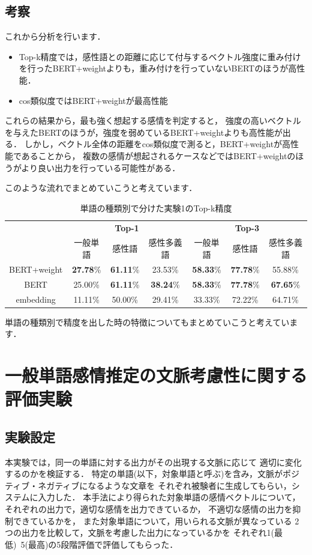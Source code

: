	\subsection{考察}
		これから分析を行います．
		\begin{itemize}
			\item Top-k精度では，感性語との距離に応じて付与するベクトル強度に重み付けを行ったBERT+weightよりも，重み付けを行っていないBERTのほうが高性能．
			\item cos類似度ではBERT+weightが最高性能
		\end{itemize}
		これらの結果から，最も強く想起する感情を判定すると，
		強度の高いベクトルを与えたBERTのほうが，強度を弱めているBERT+weightよりも高性能が出る．
		しかし，ベクトル全体の距離をcos類似度で測ると，BERT+weightが高性能であることから，
		複数の感情が想起されるケースなどではBERT+weightのほうがより良い出力を行っている可能性がある．
		
		このような流れでまとめていこうと考えています．
		\begin{table}[H]
			\centering
			\caption{単語の種類別で分けた実験1のTop-k精度}
			\label{table:top-k_cos-sim_hinshi}
				\begin{tabular}{ccccccc}
					\hline
					& \multicolumn{3}{c}{\textbf{Top-1}} & \multicolumn{3}{c}{\textbf{Top-3}} \\
					& 一般単語 & 感性語 & 感性多義語 & 一般単語 & 感性語 & 感性多義語 \\
					\hline \hline
					BERT+weight & \textbf{27.78}\% & \textbf{61.11}\% & 23.53\% & \textbf{58.33}\% & \textbf{77.78}\% & 55.88\% \\
					BERT & 25.00\% & \textbf{61.11}\% & \textbf{38.24}\% & \textbf{58.33}\% & \textbf{77.78}\% & \textbf{67.65}\% \\
					embedding & 11.11\% & 50.00\% & 29.41\% & 33.33\% & 72.22\% & 64.71\% \\
				\hline
				\end{tabular}
		\end{table}

		単語の種類別で精度を出した時の特徴についてもまとめていこうと考えています．

					

\section{一般単語感情推定の文脈考慮性に関する評価実験}
	\subsection{実験設定}
		本実験では，同一の単語に対する出力がその出現する文脈に応じて
		適切に変化するのかを検証する．
		特定の単語(以下，対象単語と呼ぶ)を含み，文脈がポジティブ・ネガティブになるような文章を
		それぞれ被験者に生成してもらい，システムに入力した．
		本手法により得られた対象単語の感情ベクトルについて，
		それぞれの出力で，適切な感情を出力できているか，
		不適切な感情の出力を抑制できているかを，
		また対象単語について，用いられる文脈が異なっている
		2つの出力を比較して，文脈を考慮した出力になっているかを
		それぞれ1(最低)~5(最高)の5段階評価で評価してもらった．


